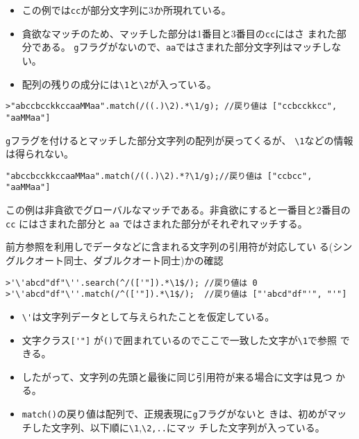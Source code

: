 \begin{Exec}
\begin{Verbatim}
\end{Verbatim}
\begin{itemize}
 \item この例では\Verb+cc+が部分文字列に3か所現れている。
 \item 貪欲なマッチのため、マッチした部分は1番目と3番目の\Verb+cc+にはさ
       まれた部分である。
       \Verb+g+フラグがないので、\Verb+aa+ではさまれた部分文字列はマッチしない。
 \item 配列の残りの成分には\Verb+\1+と\Verb+\2+が入っている。
\end{itemize}
\begin{Verbatim}
>"abccbcckkccaaMMaa".match(/((.)\2).*\1/g); //戻り値は ["ccbcckkcc", "aaMMaa"]
\end{Verbatim}
 \Verb+g+フラグを付けるとマッチした部分文字列の配列が戻ってくるが、
 \Verb+\1+などの情報は得られない。
\begin{Verbatim}
"abccbcckkccaaMMaa".match(/((.)\2).*?\1/g);//戻り値は ["ccbcc", "aaMMaa"]
\end{Verbatim}
この例は非貪欲でグローバルなマッチである。非貪欲にすると一番目と2番目の
 \Verb+cc+ にはさまれた部分と \Verb+aa+ ではさまれた部分がそれぞれマッチする。

\iffalse\else
 前方参照を利用しでデータなどに含まれる文字列の引用符が対応してい
 る(シングルクオート同士、ダブルクオート同士)かの確認\\
\begin{Verbatim}
>'\'abcd"df"\''.search(^/(['"]).*\1$/); //戻り値は 0
>'\'abcd"df"\''.match(/^(['"]).*\1$/);  //戻り値は ["'abcd"df"'", "'"]
\end{Verbatim}
\begin{itemize}
 \item \Verb+\'+は文字列データとして与えられたことを仮定している。
 \item 文字クラス\Verb+['"]+%
       が\Verb+()+で囲まれているのでここで一致した文字が\Verb+\1+で参照
       できる。
 \item したがって、文字列の先頭と最後に同じ引用符が来る場合に文字は見つ
       かる。
 \item \Verb+match()+の戻り値は配列で、正規表現に\Verb+g+フラグがないと
       きは、初めがマッチした文字列、以下順に\Verb+\1+,\Verb+\2,..+にマッ
       チした文字列が入っている。
\end{itemize}
  \fi
 \end{Exec}
